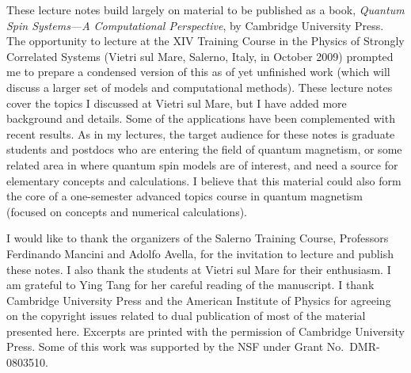 \documentclass[draft,numberedheadings]{aipproc}
\begin{document}
\begin{theacknowledgments}

These lecture notes build largely on material to be published as a book, {\it Quantum Spin Systems---A Computational Perspective}, by Cambridge 
University Press. The opportunity to lecture at the XIV Training Course in the Physics of Strongly Correlated Systems (Vietri sul Mare, Salerno,
Italy, in October 2009) prompted me to prepare a condensed version of this as of yet unfinished work (which will discuss a larger set of models and 
computational methods). These lecture notes cover the topics I discussed at Vietri sul Mare, but I have added more background and details. Some 
of the applications have been complemented with recent results. As in my lectures, the target audience for these notes is graduate students and 
postdocs who are entering the field of quantum magnetism, or some related area in where quantum spin models are of interest, and need a source 
for elementary concepts and calculations. I believe that this material could also form the core of a one-semester advanced topics course in 
quantum magnetism (focused on concepts and numerical calculations).

I would like to thank the organizers of the Salerno Training Course, Professors Ferdinando Mancini and Adolfo Avella, for the invitation to lecture and 
publish these notes. I also thank the students at Vietri sul Mare for their enthusiasm. I am grateful to Ying Tang for her careful reading of
the manuscript. I thank Cambridge University Press and the American Institute of Physics for agreeing on the copyright issues related to dual 
publication of most of the material presented here. Excerpts are printed with the permission of Cambridge University Press. Some of this work 
was supported  by the NSF under Grant No.~DMR-0803510.

\end{theacknowledgments}
\end{document}
